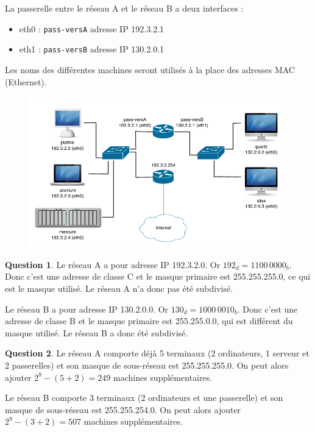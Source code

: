 \documentclass[11pt,english,french]{scrreprt}
\theoremstyle{remark}
\theoremstyle{definition}
\newtheorem{ques}{Question}[section]
\begin{document}
La passerelle entre le réseau A et le réseau B a deux interfaces :\begin{itemize}
	\item eth0 : \lstinline!pass-versA! adresse IP 192.3.2.1
	\item eth1 : \lstinline!pass-versB! adresse IP 130.2.0.1
\end{itemize}

Les noms des différentes machines seront utilisés à la place des adresses MAC (Ethernet).

\begin{figure}[h]
	\center
	\includegraphics[scale=.8]{Exam2009/Reseau}
\end{figure}

\begin{ques}
	Le réseau A a pour adresse IP 192.3.2.0. Or $192_d = 1100\,0000_b$. Donc c'est une adresse de classe C et le masque primaire est 255.255.255.0, ce qui est le masque utilisé. Le réseau A n'a donc pas été subdivisé.
	
	Le réseau B a pour adresse IP 130.2.0.0. Or $130_d = 1000\,0010_b$. Donc c'est une adresse de classe B et le masque primaire est 255.255.0.0, qui est différent du masque utilisé. Le réseau B a donc été subdivisé.
\end{ques}

\begin{ques}
	Le réseau A comporte déjà 5 terminaux (2 ordinateurs, 1 serveur et 2 passerelles) et son masque de sous-réseau est 255.255.255.0. On peut alors ajouter $2^8-(5+2) = 249$ machines supplémentaires.
	
	Le réseau B comporte 3 terminaux (2 ordinateurs et une passerelle) et son masque de sous-réseau est 255.255.254.0. On peut alors ajouter $2^9-(3+2) = 507$ machines supplémentaires.
\end{ques}
\end{document}
